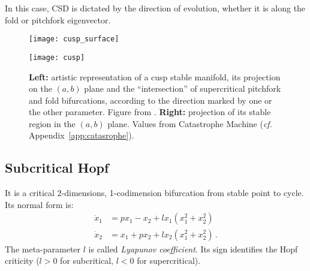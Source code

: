 In this case, CSD is dictated by the direction of evolution, whether it is along the fold or pitchfork eigenvector. \\

\begin{figure}[h!]
	\centering
	\begin{minipage}[c]{0.49\textwidth}
		\texttt{[image: cusp\_surface]}
		\renewcommand{\figurename}{Fig.}
	\end{minipage}
	\hspace{0.05cm}
	\begin{minipage}[c]{0.49\textwidth}
		\texttt{[image: cusp]}
		\renewcommand{\figurename}{Fig.}
	\end{minipage} 
	\caption{\small \textbf{Left:} artistic representation of a cusp stable manifold, its projection on the $(a,b)$ plane and the ``intersection'' of supercritical pitchfork and fold bifurcations, according to the direction marked by one or the other parameter. Figure from \textcite{stamovlasis2014bifurcation}. \textbf{Right:} projection of its stable region in the $(a,b)$ plane. Values from Catastrophe Machine (\textit{cf.} Appendix~\ref{app:catasrophe}).}
	\label{fig:cusp}
\end{figure}





\tocless\subsection{Subcritical Hopf}
It is a critical 2-dimensions, 1-codimension bifurcation from stable point to cycle. Its normal form is:
\begin{align}
	\nonumber \dot{x}_1 &= p x_1 - x_2 + l x_1(x_1^2 + x_2^2)\\
	\dot{x}_2 &= x_1 + p x_2 + l x_2(x_1^2 + x_2^2) \, .
	\label{eq:subhopf}
\end{align}
The meta-parameter $l$ is called \textit{Lyapunov coefficient}. Its sign identifies the Hopf criticity ($l>0$ for subcritical, $l<0$ for supercritical).

